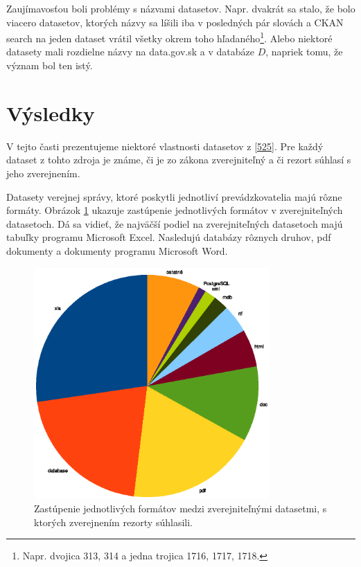 \documentclass[12pt,a4paper]{article}
\begin{document}

Zaujímavosťou boli problémy s názvami datasetov. Napr. dvakrát sa stalo, že bolo viacero datasetov, ktorých názvy sa líšili iba v posledných pár slovách a CKAN search na jeden dataset vrátil všetky okrem toho hľadaného\footnote{
Napr. dvojica 313, 314 a jedna trojica 1716, 1717, 1718.
}. Alebo niektoré datasety mali rozdielne názvy na data.gov.sk a v databáze $D$, napriek tomu, že význam bol ten istý. 

\section{Výsledky}

V tejto časti prezentujeme niektoré vlastnosti datasetov z \ref{525}. Pre každý dataset z tohto zdroja je známe, či je zo zákona zverejniteľný a či rezort súhlasí s jeho zverejnením.

Datasety verejnej správy, ktoré poskytli jednotliví prevádzkovatelia majú rôzne formáty. Obrázok \ref{formaty} ukazuje zastúpenie jednotlivých formátov v zverejniteľných datasetoch. Dá sa vidieť, že najväčší podiel na zverejniteľných datasetoch majú tabuľky programu Microsoft Excel. Nasledujú databázy rôznych druhov, pdf dokumenty a dokumenty programu Microsoft Word. 

\begin{figure}
\center \includegraphics[width=9cm]{dataset_formaty}
\caption{Zastúpenie jednotlivých formátov medzi zverejniteľnými datasetmi, s ktorých zverejnením rezorty súhlasili.}
\label{formaty}
\end{figure}
\end{document}
